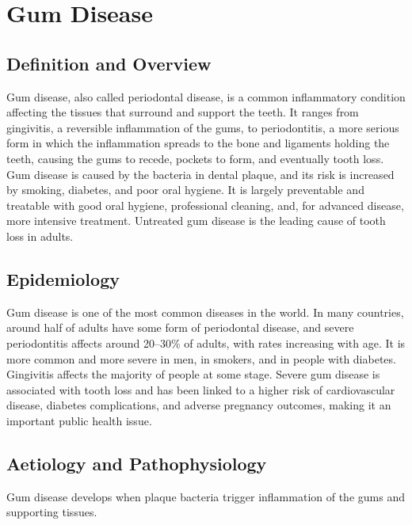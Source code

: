 \chapter{Gum Disease}

\section*{Definition and Overview}
Gum disease, also called periodontal disease, is a common inflammatory condition affecting the tissues that surround and support the teeth. It ranges from gingivitis, a reversible inflammation of the gums, to periodontitis, a more serious form in which the inflammation spreads to the bone and ligaments holding the teeth, causing the gums to recede, pockets to form, and eventually tooth loss. Gum disease is caused by the bacteria in dental plaque, and its risk is increased by smoking, diabetes, and poor oral hygiene. It is largely preventable and treatable with good oral hygiene, professional cleaning, and, for advanced disease, more intensive treatment. Untreated gum disease is the leading cause of tooth loss in adults.

\section*{Epidemiology}
Gum disease is one of the most common diseases in the world. In many countries, around half of adults have some form of periodontal disease, and severe periodontitis affects around 20--30\% of adults, with rates increasing with age. It is more common and more severe in men, in smokers, and in people with diabetes. Gingivitis affects the majority of people at some stage. Severe gum disease is associated with tooth loss and has been linked to a higher risk of cardiovascular disease, diabetes complications, and adverse pregnancy outcomes, making it an important public health issue.

\section*{Aetiology and Pathophysiology}
Gum disease develops when plaque bacteria trigger inflammation of the gums and supporting tissues.

